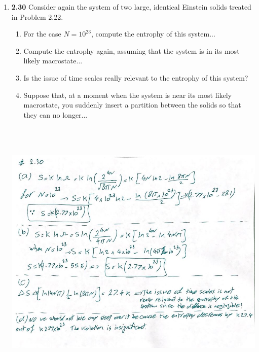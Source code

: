 \documentclass[fleqn]{article}
\begin{document}
\begin{enumerate}
    \pagebreak

    \item \textbf{2.30} Consider again the system of two large, identical Einstein solids treated in Problem 2.22.
    \begin{enumerate}
      \item For the case $N=10^{23}$, compute the entrophy of this system...


      \item Compute the entrophy again, assuming that the system is in its most likely macrostate...


      \item Is the issue of time scales really relevant to the entrophy of this system?

      
      \item Suppose that, at a moment when the system is near its most likely macrostate, you suddenly insert a partition between 
      the solids so that they can no longer...

    \end{enumerate}

    \begin{center}
      \includegraphics[height=13cm, width=14cm]{4.JPG}
    \end{center}
  
    \pagebreak


\end{enumerate}
\end{document}
